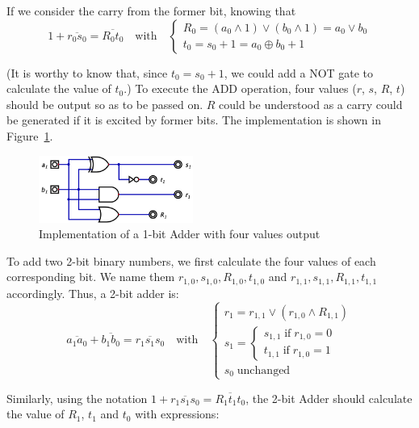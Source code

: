 \documentclass[conference]{IEEEtran}
\begin{document}
If we consider the carry from the former bit, knowing that 
\begin{equation}
    1 + \overline{r_0 s_0} = \overline{R_0 t_0} \quad \text{with} \quad \begin{cases}
        R_0 = (a_0 \wedge 1) \vee (b_0 \wedge 1) = a_0 \vee b_0  \\
        t_0 = s_0 + 1 = a_0 \oplus b_0 + 1
    \end{cases}
\end{equation}

(It is worthy to know that, since $t_0 = s_0 + 1$, we could add a NOT gate to calculate the value of $t_0$.)
To execute the ADD operation, four values ($r$, $s$, $R$, $t$) should be output so as to be passed on. $R$ could be understood as a carry could be generated if it is excited by former bits.
The implementation is shown in Figure~\ref{fig:1bit_adder}.

\begin{figure}[h!]
\centering
\includegraphics[width=0.45\textwidth]{assets/1bit_adder.png}
\caption{Implementation of a 1-bit Adder with four values output}
\label{fig:1bit_adder}
\end{figure}

To add two 2-bit binary numbers, we first calculate the four values of each corresponding bit. We name them $r_{1,0}, s_{1,0}, R_{1,0}, t_{1,0}$ and $r_{1,1}, s_{1,1}, R_{1,1}, t_{1,1}$ accordingly.
Thus, a 2-bit adder is:
\begin{equation}
    \overline{a_1 a_0} + \overline{b_1 b_0} = \overline{r_1 s_1 s_0} \quad \text{with} \quad \begin{cases}
        r_1 = r_{1,1} \vee (r_{1,0} \wedge R_{1,1}) \\
        s_1 = \begin{cases}
        s_{1,1} \; \text{if} \; r_{1,0} = 0 \\
        t_{1,1} \; \text{if} \; r_{1,0} = 1
        \end{cases} \\
        s_0 \; \text{unchanged}
    \end{cases}
\end{equation}

Similarly, using the notation $1 + \overline{r_1 s_1 s_0} = \overline{R_1 t_1 t_0}$, the 2-bit Adder should calculate the value of $R_1$, $t_1$ and $t_0$ with expressions:
\end{document}
